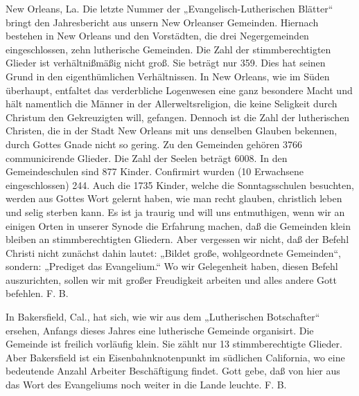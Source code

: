 New Orleans, La. Die letzte Nummer der „Evangelisch-Lutherischen Blätter“ bringt den Jahresbericht aus unsern New Orleanser Gemeinden. Hiernach bestehen in New Orleans und den Vorstädten, die drei Negergemeinden eingeschlossen, zehn lutherische Gemeinden. Die Zahl der stimmberechtigten Glieder ist verhältnißmäßig nicht groß. Sie beträgt nur 359. Dies hat seinen Grund in den eigenthümlichen Verhältnissen. In New Orleans, wie im Süden überhaupt, entfaltet das verderbliche Logenwesen eine ganz besondere Macht und hält namentlich die Männer in der Allerweltsreligion, die keine Seligkeit durch Christum den Gekreuzigten will, gefangen. Dennoch ist die Zahl der lutherischen Christen, die in der Stadt New Orleans mit uns denselben Glauben bekennen, durch Gottes Gnade nicht so gering. Zu den Gemeinden gehören 3766 communicirende Glieder. Die Zahl der Seelen beträgt 6008. In den Gemeindeschulen sind 877 Kinder. Confirmirt wurden (10 Erwachsene eingeschlossen) 244. Auch die 1735 Kinder, welche die Sonntagsschulen besuchten, werden aus Gottes Wort gelernt haben, wie man recht glauben, christlich leben und selig sterben kann. Es ist ja traurig und will uns entmuthigen, wenn wir an einigen Orten in unserer Synode die Erfahrung machen, daß die Gemeinden klein bleiben an stimmberechtigten Gliedern. Aber vergessen wir nicht, daß der Befehl Christi nicht zunächst dahin lautet: „Bildet große, wohlgeordnete Gemeinden“, sondern: „Prediget das Evangelium.“ Wo wir Gelegenheit haben, diesen Befehl auszurichten, sollen wir mit großer Freudigkeit arbeiten und alles andere Gott befehlen. F. B.

In Bakersfield, Cal., hat sich, wie wir aus dem „Lutherischen Botschafter“ ersehen, Anfangs dieses Jahres eine lutherische Gemeinde organisirt. Die Gemeinde ist freilich vorläufig klein. Sie zählt nur 13 stimmberechtigte Glieder. Aber Bakersfield ist ein Eisenbahnknotenpunkt im südlichen California, wo eine bedeutende Anzahl Arbeiter Beschäftigung findet. Gott gebe, daß von hier aus das Wort des Evangeliums noch weiter in die Lande leuchte. F. B.

